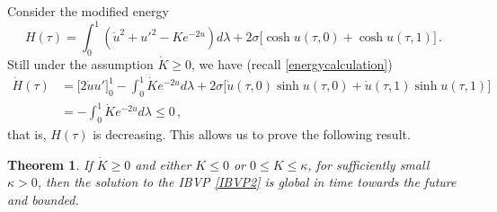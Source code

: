 \documentclass[10pt]{amsart}
\newtheorem{Thm}{Theorem}[section]
\begin{document}
Consider the modified energy
\begin{equation}
H(\tau) = \int_0^1 \left( \dot{u}^2 + u'^2 - K e^{-2u} \right) d\lambda + 2\sigma \Big[ \cosh u(\tau,0) + \cosh u(\tau,1) \Big] \, .
\end{equation}
Still under the assumption $\dot{K} \geq 0$, we have (recall \eqref{energycalculation})
\begin{align}
\dot{H}(\tau) & = \Big[ 2\dot{u}u' \Big]_0^1 - \int_0^1 \dot{K} e^{-2u}d\lambda + 2\sigma \Big[ \dot{u}(\tau,0)\sinh u(\tau,0) + \dot{u}(\tau,1)\sinh u(\tau,1) \Big] \nonumber \\ 
& = - \int_0^1 \dot{K} e^{-2u}d\lambda \leq 0 \, , 
\end{align}
that is, $H(\tau)$ is decreasing. This allows us to prove the following result.

\begin{Thm} \label{globalintime2}
If $\dot{K} \geq 0$ and either $K \leq 0$ or $0 \leq K \leq \kappa$, for sufficiently small $\kappa > 0$, then the solution to the IBVP \eqref{IBVP2} is global in time towards the future and bounded.
\end{Thm}
\end{document}
